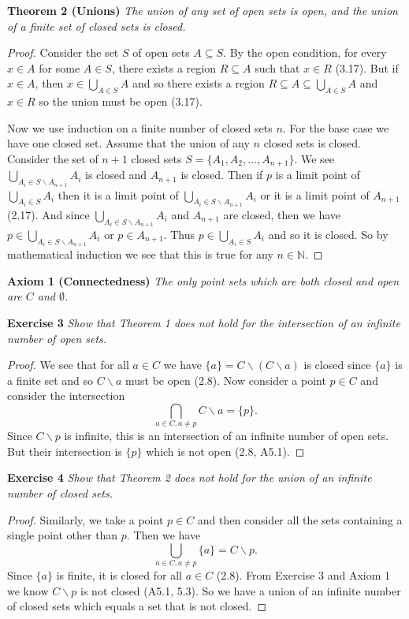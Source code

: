 \documentclass{article}
\begin{document}
\begin{flushleft}
\textbf{Theorem 2 (Unions)}
\textsl{The union of any set of open sets is open, and the union of a finite set of closed sets is closed.}
\begin{proof}
Consider the set $S$ of open sets $A \subseteq S$. By the open condition, for every $x \in A$ for some $A \in S$, there exists a region $R \subseteq A$ such that $x \in R$ (3.17). But if $x \in A$, then $x \in \bigcup_{A \in S} A$ and so there exists a region $R \subseteq A \subseteq \bigcup_{A \in S} A$ and $x \in R$ so the union must be open (3.17).\newline

Now we use induction on a finite number of closed sets $n$. For the base case we have one closed set. Assume that the union of any $n$ closed sets is closed. Consider the set of $n+1$ closed sets $S=\{A_1,A_2, \dots ,A_{n+1} \}$. We see $\bigcup_{A_i \in S \backslash A_{n+1}} A_i$ is closed and $A_{n+1}$ is closed. Then if $p$ is a limit point of $\bigcup_{A_i \in S} A_i$ then it is a limit point of $\bigcup_{A_i \in S \backslash A_{n+1}} A_i$ or it is a limit point of $A_{n+1}$ (2.17). And since $\bigcup_{A_i \in S \backslash A_{n+1}} A_i$ and $A_{n+1}$ are closed, then we have $p \in \bigcup_{A_i \in S \backslash A_{n+1}} A_i$ or $p \in A_{n+1}$. Thus $p \in \bigcup_{A_i \in S} A_i$ and so it is closed. So by mathematical induction we see that this is true for any $n \in \mathbb{N}$.
\end{proof}

\textbf{Axiom 1 (Connectedness)}
\textsl{The only point sets which are both closed and open are $C$ and $\emptyset$.}\newline

\textbf{Exercise 3}
\textsl{Show that Theorem 1 does not hold for the intersection of an infinite number of open sets.}
\begin{proof}
We see that for all $a \in C$ we have $\{a\}=C \backslash (C \backslash a)$ is closed since $\{a\}$ is a finite set and so $C \backslash a$ must be open (2.8). Now consider a point $p \in C$ and consider the intersection
\[
\bigcap_{a \in C, a \neq p} C \backslash a = \{p\}.
\]
Since $C \backslash p$ is infinite, this is an intersection of an infinite number of open sets. But their intersection is $\{p\}$ which is not open (2.8, A5.1).
\end{proof}

\textbf{Exercise 4}
\textsl{Show that Theorem 2 does not hold for the union of an infinite number of closed sets.}
\begin{proof}
Similarly, we take a point $p \in C$ and then consider all the sets containing a single point other than $p$. Then we have
\[
\bigcup_{a \in C, a \neq p} \{a\} = C \backslash p.
\]
Since $\{a\}$ is finite, it is closed for all $a \in C$ (2.8). From Exercise 3 and Axiom 1 we know $C \backslash p$ is not closed (A5.1, 5.3). So we have a union of an infinite number of closed sets which equals a set that is not closed.
\end{proof}


\end{flushleft}
\end{document}
